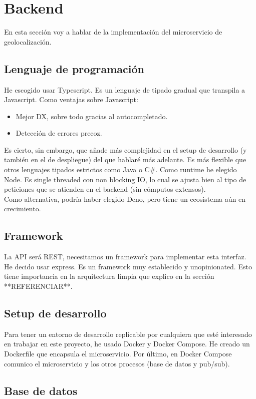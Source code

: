 \chapter{Backend}

En esta sección voy a hablar de la implementación del microservicio de geolocalización.
\section{Lenguaje de programación}
He escogido usar Typescript. Es un lenguaje de tipado gradual que transpila a Javascript.
Como ventajas sobre Javascript:
\begin{itemize}
	\item Mejor DX, sobre todo gracias al autocompletado.
	\item Detección de errores precoz.
\end{itemize}
Es cierto, sin embargo, que añade más complejidad en el setup de desarrollo (y también en el de despliegue) del que hablaré más adelante.
Es más flexible que otros lenguajes tipados estrictos como Java o C\#.
Como runtime he elegido Node. Es single threaded con non blocking IO, lo cual se ajusta bien al tipo 
de peticiones que se atienden en el backend (sin cómputos extensos).  \\
Como alternativa, podría haber elegido Deno, pero tiene un ecosistema aún en crecimiento.

\section{Framework}
La API será REST, necesitamos un framework para implementar esta interfaz. \\

He decido usar express. Es un framework muy establecido y unopinionated. Esto tiene importancia en la 
arquitectura limpia que explico en la sección **REFERENCIAR**. 

\section{Setup de desarrollo}

Para tener un entorno de desarrollo replicable por cualquiera que esté interesado en trabajar en este proyecto, 
he usado Docker y Docker Compose. He creado un Dockerfile que encapsula el microservicio. 
Por último, en Docker Compose comunico el microservicio y los otros procesos (base de datos y pub/sub).


\section{Base de datos}

